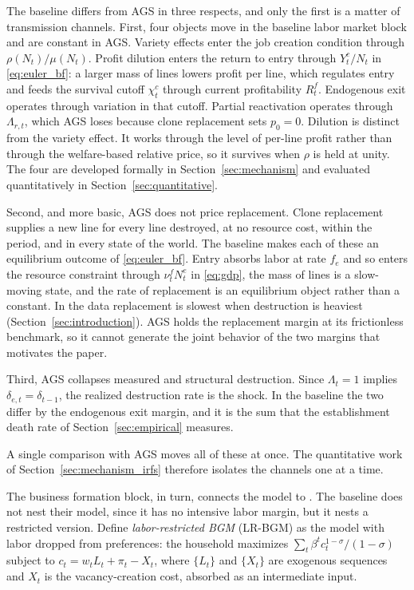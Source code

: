 \documentclass[authoryear, review, 12pt]{elsarticle}
\begin{document}
The baseline differs from AGS in three respects, and only the first is a matter of
transmission channels. First, four objects move in the baseline labor market block
and are constant in AGS. Variety effects enter the job
creation condition through $\rho(N_t)/\mu(N_t)$. Profit
dilution enters the return to entry through $Y_t^c/N_t$ in
\eqref{eq:euler_bf}: a larger mass of lines lowers profit
per line, which regulates entry and feeds the survival
cutoff $\chi_t^c$ through current profitability $R_t^f$.
Endogenous exit operates through variation in that cutoff.
Partial reactivation operates through $\Lambda_{r,t}$, which
AGS loses because clone replacement sets $p_0=0$. Dilution
is distinct from the variety effect. It works through the
level of per-line profit rather than through the
welfare-based relative price, so it survives when $\rho$ is
held at unity. The four are developed formally in
Section~\ref{sec:mechanism} and evaluated quantitatively in
Section~\ref{sec:quantitative}.

Second, and more basic, AGS does not price replacement.
Clone replacement supplies a new line for every line
destroyed, at no resource cost, within the period, and in
every state of the world. The baseline makes each of these
an equilibrium outcome of \eqref{eq:euler_bf}. Entry absorbs
labor at rate $f_e$ and so enters the resource constraint
through $\nu_t^f N_t^e$ in \eqref{eq:gdp}, the mass of lines
is a slow-moving state, and the rate of replacement is an
equilibrium object rather than a constant. In the data replacement is slowest when
destruction is heaviest (Section~\ref{sec:introduction}). AGS holds the replacement
margin at its frictionless benchmark, so it cannot generate
the joint behavior of the two margins that motivates the
paper.

Third, AGS collapses measured and structural destruction.
Since $\Lambda_t=1$ implies $\delta_{e,t}=\delta_{t-1}$, the
realized destruction rate is the shock. In the baseline the
two differ by the endogenous exit margin, and it is the sum
that the establishment death rate of
Section~\ref{sec:empirical} measures.

A single comparison with AGS moves all of these at once. The quantitative work of
Section~\ref{sec:mechanism_irfs} therefore isolates the channels one at a time.

The business formation block, in turn, connects the model to \citet{bilbiie_2012}. The
baseline does not nest their model, since it has no intensive labor margin, but it nests a
restricted version. Define \emph{labor-restricted BGM} (LR-BGM) as the
\citet{bilbiie_2012} model with labor dropped from preferences: the household maximizes
$\sum_t \beta^t c_t^{1-\sigma}/(1-\sigma)$ subject to $c_t = w_t L_t + \pi_t - X_t$, where
$\{L_t\}$ and $\{X_t\}$ are exogenous sequences and $X_t$ is the vacancy-creation cost,
absorbed as an intermediate input.
\end{document}
